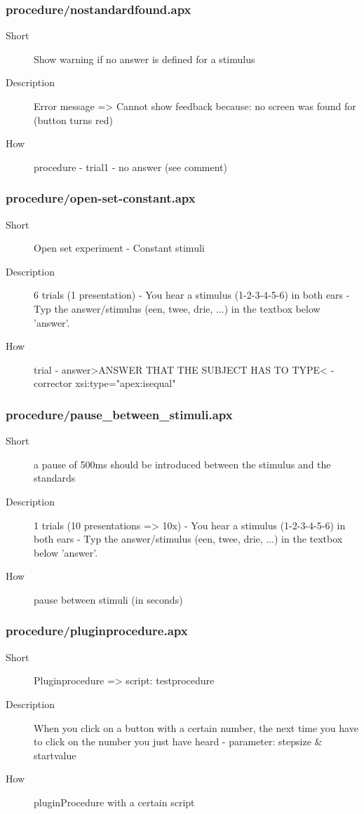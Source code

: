 \subsubsection{procedure/nostandardfound.apx}
\begin{description}
\item[Short] 
 Show warning if no answer is defined for a stimulus
\item[Description] 
 Error message =\textgreater{} Cannot show feedback because: no screen was found for (button turns red)
\item[How] 
 procedure - trial1 - no answer (see comment)
\end{description}

\subsubsection{procedure/open-set-constant.apx}
\begin{description}
\item[Short] 
 Open set experiment - Constant stimuli
\item[Description] 
 6 trials (1 presentation) - You hear a stimulus (1-2-3-4-5-6) in both ears - Typ the answer/stimulus (een, twee, drie, ...) in the textbox below 'answer'.
\item[How] 
 trial - answer\textgreater{}ANSWER THAT THE SUBJECT HAS TO TYPE\textless{} - corrector xsi:type="apex:isequal"
\end{description}

\subsubsection{procedure/pause\_between\_stimuli.apx}
\begin{description}
\item[Short] 
  a pause of 500ms should be introduced between the stimulus and the standards
\item[Description] 
 1 trials (10 presentations =\textgreater{} 10x) - You hear a stimulus (1-2-3-4-5-6) in both ears - Typ the answer/stimulus (een, twee, drie, ...) in the textbox below 'answer'.
\item[How] 
 pause between stimuli (in seconds)
\end{description}

\subsubsection{procedure/pluginprocedure.apx}
\begin{description}
\item[Short] 
 Pluginprocedure =\textgreater{} script: testprocedure
\item[Description] 
 When you click on a button with a certain number, the next time you have to click on the number you just have heard - parameter: stepsize \& startvalue
\item[How] 
 pluginProcedure with a certain script
\end{description}

